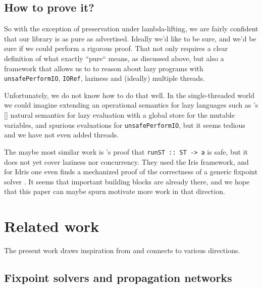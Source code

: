 \documentclass[manuscript,anonymous,screen,acmsmall]{acmart}
\begin{document}
% 


\subsection{How to prove it?}

So with the exception of preservation under lambda-lifting, we are fairly confident that our library is as pure as advertised. Ideally we'd like to be sure, and we’d be sure if we could perform a rigorous proof.  That not only requires a clear definition of what exactly “pure“ means, as discussed above, but also a framework that allows us to to reason about lazy programs with \verb|unsafePerformIO|, \verb|IORef|, laziness and (ideally) multiple threads.

Unfortunately, we do not know how to do that well. In the single-threaded world we could imagine extending an operational semantics for lazy languages such as \citeauthor{launchbury}’s [\citeyear{launchbury}] natural semantics for lazy evaluation with a global store for the mutable variables, and spurious evaluations for \verb|unsafePerformIO|, but it seems tedious and we have not even added threads.

The maybe most similar work is \citeauthor{runST}'s \citeyear{runST} proof that \verb|runST :: ST -> a| is safe, but it does not yet cover laziness nor concurrency.
They used the Iris framework, and for Idris one even finds a mechanized proof of the correctness of a generic fixpoint solver \citep{spygame}.
It seems that important building blocks are already there, and we hope that this paper can maybe spurn motivate more work in that direction.


\section{Related work}\label{sec:related}

The present work draws inspiration from and connects to various directions.

\subsection{Fixpoint solvers and propagation networks}
\end{document}
